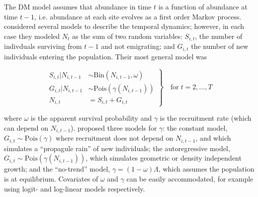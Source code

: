 \documentclass[12pt,english]{article}
\begin{document}
\begin{spacing}{1.9}
\begin{flushleft}
The DM model assumes that abundance in time $t$ is a function of
abundance at time $t-1$, i.e. abundance at each site evolves as a
first order Markov process. %
\citet{dail_madsen:2011} considered several models to describe the temporal dynamics;
however, in each case they modeled $N_t$ as the sum of two random variables:
$S_{i,t}$, the number of indivduals surviving from $t-1$ and not
emigrating; and $G_{i,t}$ the number of new individuals entering
the population. Their most general model was
\begin{linenomath*}
\begin{equation}
\left.\begin{aligned}
S_{i,t}|N_{i,t-1} &\sim \mathrm{Bin}(N_{i,t-1}, \omega) \\
G_{i,t}|N_{i,t-1} &\sim \mathrm{Pois}(\gamma(N_{i,t-1})) \\
N_{i,t} &= S_{i,t}+G_{i,t}
\end{aligned}\right\} \quad \text{for} \; t=2,\hdots,T
\label{eq:Nt}
\end{equation}
\end{linenomath*}
where $\omega$ is the apparent survival probability and $\gamma$
is the recruitment rate (which can depend on $N_{i,t-1}$).
\citet{dail_madsen:2011} proposed three
models for $\gamma$: the constant model,
$G_{i,t} \sim \mathrm{Pois}(\gamma)$ where recruitment does not
depend on $N_{i,t-1}$, and which simulates a ``propagule rain'' of new
individuals; the autoregressive model, $G_{i,t} \sim
\mathrm{Pois}(\gamma(N_{i,t-1}))$, which
simulates geometric or density independent growth; and the
``no-trend'' model, $\gamma = (1-\omega)\Lambda$, which assumes the
population is at equilibrium. Covariates of
$\omega$ and $\gamma$ can be easily accommodated, for example
using logit- and log-linear models respectively.


\end{flushleft}
\end{spacing}
\end{document}
